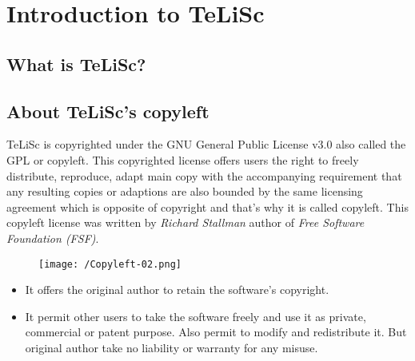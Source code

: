 \documentclass[a4paper,12pt]{book}
\date{September 2017}
\begin{document}
\frontmatter
\tableofcontents{}

\maketitle

 
\chapter{Introduction to TeLiSc}

\section{What is TeLiSc?}

\section{About TeLiSc’s copyleft}

TeLiSc is copyrighted under the GNU General Public License v3.0 also called the GPL or copyleft. This copyrighted license offers users the right to freely distribute, reproduce, adapt main copy with the accompanying requirement that any resulting copies or adaptions are also bounded by the same licensing agreement which is opposite of copyright and that’s why it is called copyleft. This copyleft license was written by \textit{Richard Stallman} author of \textit{Free Software Foundation (FSF)}.

\begin{figure}
\centering
\texttt{[image: /Copyleft-02.png]}
\end{figure}

\begin{itemize}
\item It offers the original author to retain the software’s copyright.
\item 	It permit other users to take the software freely and use it as private, commercial or patent purpose. Also permit to modify and redistribute it. But original author take no liability or warranty for any misuse. 
\end{itemize}
\end{document}
